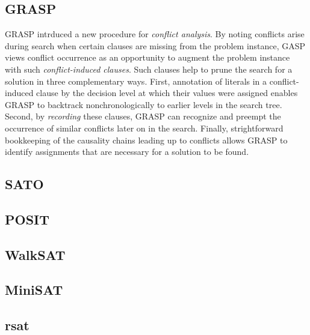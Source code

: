 \subsection{GRASP}

GRASP intrduced a new procedure for {\em conflict analysis\/}. 
By noting conflicts arise during search when certain clauses are missing from
the problem instance, GASP views conflict occurrence as an opportunity to
augment the problem instance with such {\em conflict-induced clauses\/}.
Such clauses help to prune the search for a solution in three complementary
ways.
  \ben
  \w First, annotation of literals in a conflict-induced clause by the
  decision level at which their values were assigned enables GRASP to
  backtrack nonchronologically to earlier levels in the search tree.
  \w Second, by {\em recording\/} these clauses, GRASP can recognize and
  preempt the occurrence of similar conflicts later on in the search. 
  \w Finally, strightforward bookkeeping of the causality chains leading up 
  to conflicts allows GRASP to identify assignments that are necessary for a
  solution to be found.
  \een



\subsection{SATO}

\subsection{POSIT}
\subsection{WalkSAT}
\subsection{MiniSAT}
\subsection{rsat}

